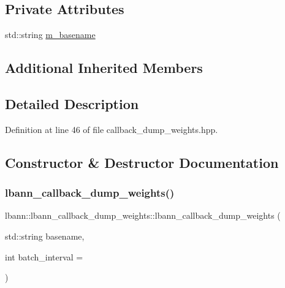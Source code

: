 \subsection*{Private Attributes}
\begin{DoxyCompactItemize}
\item 
std\+::string \hyperlink{classlbann_1_1lbann__callback__dump__weights_a6c73416bd2edd414e7c4094a19ae2d79}{m\+\_\+basename}
\end{DoxyCompactItemize}
\subsection*{Additional Inherited Members}


\subsection{Detailed Description}


Definition at line 46 of file callback\+\_\+dump\+\_\+weights.\+hpp.



\subsection{Constructor \& Destructor Documentation}
\mbox{\label{classlbann_1_1lbann__callback__dump__weights_a6ad86c6dec233324f013e9d83e574267}} 
\subsubsection{\texorpdfstring{lbann\+\_\+callback\+\_\+dump\+\_\+weights()}{lbann\_callback\_dump\_weights()}\hspace{0.1cm}{\footnotesize\ttfamily [1/2]}}
{\footnotesize\ttfamily lbann\+::lbann\+\_\+callback\+\_\+dump\+\_\+weights\+::lbann\+\_\+callback\+\_\+dump\+\_\+weights (\begin{DoxyParamCaption}\item[{std\+::string}]{basename,  }\item[{int}]{batch\+\_\+interval = {} }\end{DoxyParamCaption})\hspace{0.3cm}{\ttfamily [inline]}}


